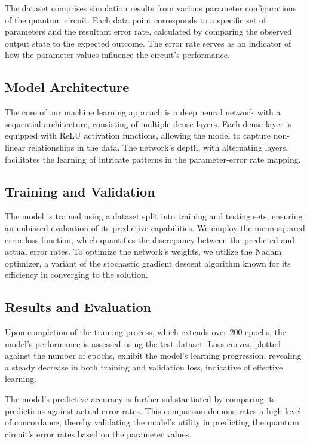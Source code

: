 \documentclass{article}
\begin{document}
\begin{multicols}{2}
    The dataset comprises simulation results from various parameter configurations of the quantum circuit. Each data point corresponds to a specific set of parameters and the resultant error rate, calculated by comparing the observed output state to the expected outcome. The error rate serves as an indicator of how the parameter values influence the circuit's performance.
    
\subsection{Model Architecture}
    
    The core of our machine learning approach is a deep neural network with a sequential architecture, consisting of multiple dense layers. Each dense layer is equipped with ReLU activation functions, allowing the model to capture non-linear relationships in the data. The network's depth, with alternating layers, facilitates the learning of intricate patterns in the parameter-error rate mapping.
    
\subsection{Training and Validation}
    
    The model is trained using a dataset split into training and testing sets, ensuring an unbiased evaluation of its predictive capabilities. We employ the mean squared error loss function, which quantifies the discrepancy between the predicted and actual error rates. To optimize the network's weights, we utilize the Nadam optimizer, a variant of the stochastic gradient descent algorithm known for its efficiency in converging to the solution.
    
\subsection{Results and Evaluation}
    
    Upon completion of the training process, which extends over 200 epochs, the model's performance is assessed using the test dataset. Loss curves, plotted against the number of epochs, exhibit the model's learning progression, revealing a steady decrease in both training and validation loss, indicative of effective learning.
    
    The model's predictive accuracy is further substantiated by comparing its predictions against actual error rates. This comparison demonstrates a high level of concordance, thereby validating the model's utility in predicting the quantum circuit's error rates based on the parameter values. 


\end{multicols}
\end{document}
